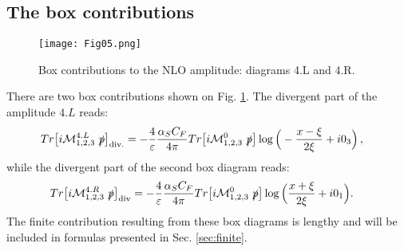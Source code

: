 \documentclass[aps,prd,superscriptaddress,floatfix,showpacs]{revtex4}
\begin{document}
\subsection{The box contributions }
\begin{figure}[h]
    \centering
\texttt{[image: Fig05.png]}
    \caption{Box contributions to the NLO amplitude: diagrams 4.L and 4.R.}
    \label{4LR}
\end{figure}
There are two box contributions shown on Fig. \ref{4LR}. The divergent part of the amplitude $4.L$ reads:
\begin{equation}
\begin{aligned}
    Tr\big[i\mathcal{M}^{4.L}_{1,2,3}~ \slashed{p} \big]_{\mathrm{div.}}&= 
-\frac{4}{\varepsilon} \frac{\alpha_S C_F}{4\pi} Tr\big[i\mathcal{M}^{0}_{1,2,3}~ \slashed{p} \big] \log \Big{(} -\frac{x-\xi}{2\xi} + i0_3 \Big{)}\,,
\end{aligned}
\label{eq:4L}
\end{equation}
while the divergent part of the second box diagram reads:
\begin{equation}
\begin{aligned}
    Tr\big[i\mathcal{M}^{4.R}_{1,2,3}~\slashed{p}\big]_{\mathrm{div}}&= 
-\frac{4}{\varepsilon} \frac{\alpha_S C_F}{4\pi} Tr\big[i\mathcal{M}^{0}_{1,2,3}~ \slashed{p} \big] \log \Big{(} \frac{x+\xi}{2\xi} + i0_1 \Big{)}.
\end{aligned}
\label{eq:4R}
\end{equation}
The finite contribution resulting from these box diagrams is lengthy and will be  included in formulas presented in Sec. \ref{sec:finite}.
\end{document}

